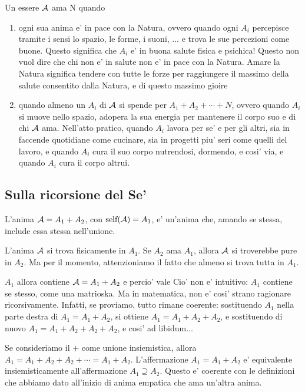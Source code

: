 Un essere $\mathcal{A}$ ama N quando 
\begin{enumerate}
    \item ogni sua anima e' in pace con la Natura, ovvero quando ogni $A_i$ percepisce tramite i sensi lo spazio, le forme, i suoni, ... e trova le sue percezioni come buone. Questo significa che $A_i$ e' in buona salute fisica e psichica! Questo non vuol dire che chi non e' in salute non e' in pace con la Natura. Amare la Natura significa tendere con tutte le forze per raggiungere il massimo della salute consentito dalla Natura, e di questo massimo gioire
    \item quando almeno un $A_i$ di $\mathcal{A}$ si spende per $A_1+A_2+\cdots+N$, ovvero quando $A_i$ si muove nello spazio, adopera la sua energia per mantenere il corpo suo e di chi $\mathcal{A}$ ama. Nell'atto pratico, quando $A_i$ lavora per se' e per gli altri, sia in faccende quotidiane come cucinare, sia in progetti piu' seri come quelli del lavoro, e quando $A_i$ cura il suo corpo nutrendosi, dormendo, e cosi' via, e quando $A_i$ cura il corpo altrui.
\end{enumerate}


\subsection{Sulla ricorsione del Se'}
\label{ricorsioneSe}

L'anima $\mathcal{A}=A_1+A_2$, con $\textrm{self}(\mathcal{A})=A_1$, e' un'anima che, amando se stessa, include essa stessa nell'unione. 

L'anima $\mathcal{A}$ si trova fisicamente in $A_1$. Se $A_2$ ama $A_1$, allora $\mathcal{A}$ si troverebbe pure in $A_2$. Ma per il momento, attenzioniamo il fatto che almeno si trova tutta in $A_1$.

$A_1$ allora contiene $\mathcal{A}=A_1+A_2$ e percio' vale 
Cio' non e' intuitivo: $A_1$ contiene se stesso, come una matrioska. Ma in matematica, non e' cosi' strano ragionare ricorsivamente. Infatti, se proviamo, tutto rimane coerente: sostituendo $A_1$ nella parte destra di $A_1=A_1+A_2$, si ottiene $A_1=A_1+A_2+A_2$, e sostituendo di nuovo $A_1=A_1+A_2+A_2+A_2$, e cosi' ad libidum...

Se consideriamo il $+$ come unione insiemistica, allora $A_1=A_1+A_2+A_2+\cdots = A_1+A_2$. L'affermazione $A_1=A_1+A_2$ e' equivalente insiemisticamente all'affermazione $A_1 \supseteq A_2$. Questo e' coerente con le definizioni che abbiamo dato all'inizio di anima empatica che ama un'altra anima.

